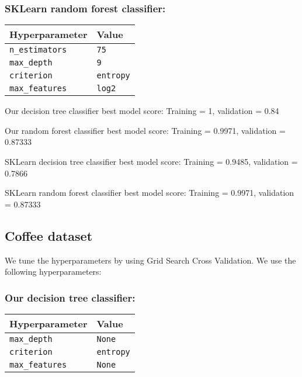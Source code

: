 \documentclass[11pt]{article}
\begin{document}
\subsubsection{SKLearn random forest
classifier:}\label{sklearn-random-forest-classifier}

\begin{longtable}[]{@{}ll@{}}
\toprule\noalign{}
Hyperparameter & Value \\
\midrule\noalign{}
\endhead
\bottomrule\noalign{}
\endlastfoot
\texttt{n\_estimators} & \texttt{75} \\
\texttt{max\_depth} & \texttt{9} \\
\texttt{criterion} & \texttt{entropy} \\
\texttt{max\_features} & \texttt{log2} \\
\end{longtable}

Our decision tree classifier best model score: Training = 1, validation
= 0.84

Our random forest classifier best model score: Training = 0.9971,
validation = 0.87333

SKLearn decision tree classifier best model score: Training = 0.9485,
validation = 0.7866

SKLearn random forest classifier best model score: Training = 0.9971,
validation = 0.87333

    \subsection{Coffee dataset}\label{coffee-dataset}

We tune the hyperparameters by using Grid Search Cross Validation. We
use the following hyperparameters:

\subsubsection{Our decision tree
classifier:}\label{our-decision-tree-classifier}

\begin{longtable}[]{@{}ll@{}}
\toprule\noalign{}
Hyperparameter & Value \\
\midrule\noalign{}
\endhead
\bottomrule\noalign{}
\endlastfoot
\texttt{max\_depth} & \texttt{None} \\
\texttt{criterion} & \texttt{entropy} \\
\texttt{max\_features} & \texttt{None} \\
\end{longtable}
\end{document}

